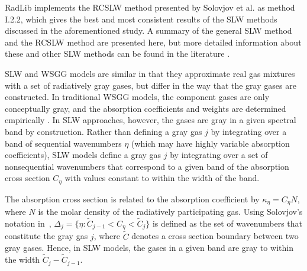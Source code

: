 \documentclass[preprint,12pt]{elsarticle}
\begin{document}
RadLib implements the RCSLW method presented by Solovjov et al. \cite{Solovjov_2017} as method I.2.2, which gives the best and most consistent results of the SLW methods discussed in the aforementioned study. A summary of the general SLW method and the RCSLW method are presented here, but more detailed information about these and other SLW methods can be found in the literature \cite{Solovjov_2000, Solovjov_2001, Solovjov_2008, Solovjov_2011, Solovjov_2014, Solovjov_2016, Solovjov_2017, Webb_2018}.

SLW and WSGG models are similar in that they approximate real gas mixtures with a set of radiatively gray gases, but differ in the way that the gray gases are constructed. In traditional WSGG models, the component gases are only conceptually gray, and the absorption coefficients and weights are determined empirically \citep{Badger_2019}. In SLW approaches, however, the gases are gray in a given spectral band by construction. Rather than defining a gray gas $j$ by integrating over a band of sequential wavenumbers $\eta$ (which may have highly variable absorption coefficients), SLW models define a gray gas $j$ by integrating over a set of nonsequential wavenumbers that correspond to a given band of the absorption cross section $C_{\eta}$ with values constant to within the width of the band.

The absorption cross section is related to the absorption coefficient by $\kappa_\eta=C_\eta N$, where $N$ is the molar density of the radiatively participating gas.
%
Using Solovjov's notation in~\cite{Solovjov_2017}, $\Delta_j=\{\eta:\tilde{C}_{j-1}<C_\eta<\tilde{C}_j\}$ is defined as the set of wavenumbers that constitute the gray gas $j$, where $\tilde{C}$ denotes a cross section boundary between two gray gases. Hence, in SLW models, the gases in a given band are gray to within the width $\tilde{C}_j-\tilde{C}_{j-1}$.
\end{document}
